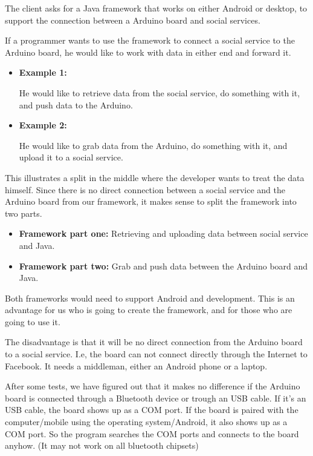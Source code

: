 The client asks for a Java framework that works on either Android or desktop, to support the connection between a Arduino board and social services.

If a programmer wants to use the framework to connect a social service to the Arduino board, he would like to work with data in either end and forward it.

\begin{itemize}
  \item\textbf{Example 1:} 

  He would like to retrieve data from the social service, do something with it, and push data to the Arduino.

  \item\textbf{Example 2:}

  He would like to grab data from the Arduino, do something with it, and upload it to a social service.
\end{itemize}

This illustrates a split in the middle where the developer wants to treat the data himself. Since there is no direct connection between a social service and the Arduino board from our framework, it makes sense to split the framework into two parts.

\begin{itemize}
  \item\textbf{Framework part one:} Retrieving and uploading data between social service and Java.
  \item\textbf{Framework part two:} Grab and push data between the Arduino board and Java.
\end{itemize}

Both frameworks would need to support Android and development. This is an advantage for us who is going to create the framework, and for those who are going to use it.

The disadvantage is that it will be no direct connection from the Arduino board to a social service.
I.e, the board can not connect directly through the Internet to Facebook. It needs a middleman, either an Android phone or a laptop.

After some tests, we have figured out that it makes no difference if the Arduino board is connected through a Bluetooth device or trough an USB cable. If it's an USB cable, the board shows up as a COM port. If the board is paired with the computer/mobile using the operating system/Android, it also shows up as a COM port. So the program searches the COM ports and connects to the board anyhow. (It may not work on all bluetooth chipsets)



